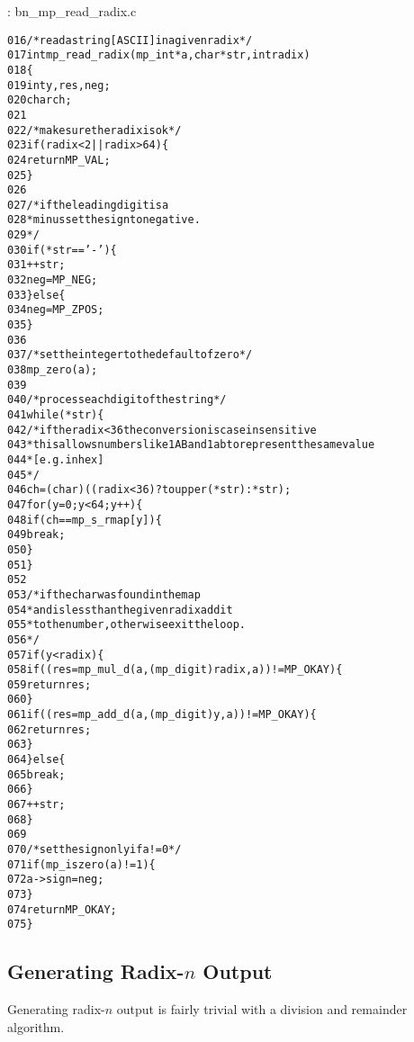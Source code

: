\documentclass[b5paper]{book}
\begin{document}
\vspace{+3mm}\begin{small}
\hspace{-5.1mm}{\bf File}: bn\_mp\_read\_radix.c
\vspace{-3mm}
\begin{alltt}
016   /* read a string [ASCII] in a given radix */
017   int mp_read_radix (mp_int * a, char *str, int radix)
018   \{
019     int     y, res, neg;
020     char    ch;
021   
022     /* make sure the radix is ok */
023     if (radix < 2 || radix > 64) \{
024       return MP_VAL;
025     \}
026   
027     /* if the leading digit is a 
028      * minus set the sign to negative. 
029      */
030     if (*str == '-') \{
031       ++str;
032       neg = MP_NEG;
033     \} else \{
034       neg = MP_ZPOS;
035     \}
036   
037     /* set the integer to the default of zero */
038     mp_zero (a);
039     
040     /* process each digit of the string */
041     while (*str) \{
042       /* if the radix < 36 the conversion is case insensitive
043        * this allows numbers like 1AB and 1ab to represent the same  value
044        * [e.g. in hex]
045        */
046       ch = (char) ((radix < 36) ? toupper (*str) : *str);
047       for (y = 0; y < 64; y++) \{
048         if (ch == mp_s_rmap[y]) \{
049            break;
050         \}
051       \}
052   
053       /* if the char was found in the map 
054        * and is less than the given radix add it
055        * to the number, otherwise exit the loop. 
056        */
057       if (y < radix) \{
058         if ((res = mp_mul_d (a, (mp_digit) radix, a)) != MP_OKAY) \{
059            return res;
060         \}
061         if ((res = mp_add_d (a, (mp_digit) y, a)) != MP_OKAY) \{
062            return res;
063         \}
064       \} else \{
065         break;
066       \}
067       ++str;
068     \}
069     
070     /* set the sign only if a != 0 */
071     if (mp_iszero(a) != 1) \{
072        a->sign = neg;
073     \}
074     return MP_OKAY;
075   \}
\end{alltt}
\end{small}

\subsection{Generating Radix-$n$ Output}
Generating radix-$n$ output is fairly trivial with a division and remainder algorithm.  
\end{document}
